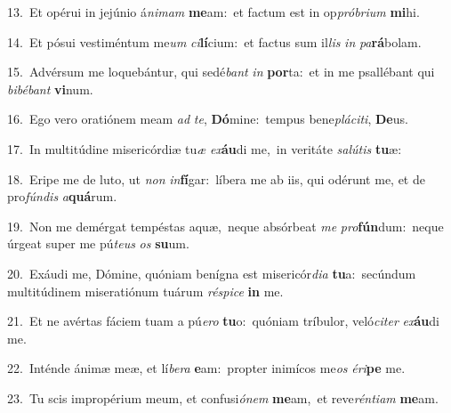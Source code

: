 {\numbfont\textcolor{\numbcolor}{13.}}~Et opérui in jejúnio á\-\textit{ni}\-\textit{mam} \textbf{me}\-am:~\star et factum est in op\-\textit{pró}\-\textit{bri}\textit{um} \textbf{mi}\-hi.\par
{\numbfont\textcolor{\numbcolor}{14.}}~Et pósui vestiméntum me\textit{um} \textit{ci}\-\textbf{lí}cium:~\star et factus sum il\textit{lis} \textit{in} \textit{pa}\-\textbf{rá}bolam.\par
{\numbfont\textcolor{\numbcolor}{15.}}~Advérsum me loquebántur, qui sedé\textit{bant} \textit{in} \textbf{por}\-ta:~\star et in me psallébant qui \textit{bi}\-\textit{bé}\textit{bant} \textbf{vi}\-num.\par
{\numbfont\textcolor{\numbcolor}{16.}}~Ego vero oratiónem meam \textit{ad} \textit{te}\-, \textbf{Dó}\-mine:~\star tempus bene\-\textit{plá}\-\textit{ci}\textit{ti}, \textbf{De}\-us.\par
{\numbfont\textcolor{\numbcolor}{17.}}~In multitúdine misericórdiæ tu\textit{æ} \textit{ex}\-\textbf{áu}di me,~\star in veritáte \textit{sa}\-\textit{lú}\textit{tis} \textbf{tu}\-æ:\par
{\numbfont\textcolor{\numbcolor}{18.}}~Eripe me de luto, ut \textit{non} \textit{in}\-\textbf{fí}gar:~\star líbera me ab iis, qui odérunt me, et de pro\-\textit{fún}\-\textit{dis} \textit{a}\-\textbf{quá}rum.\par
{\numbfont\textcolor{\numbcolor}{19.}}~Non me demérgat tempéstas aquæ,~\dagger neque absórbeat \textit{me} \textit{pro}\-\textbf{fún}dum:~\star neque úrgeat super me pú\-\textit{te}\-\textit{us} \textit{os} \textbf{su}\-um.\par
{\numbfont\textcolor{\numbcolor}{20.}}~Exáudi me, Dómine, quóniam benígna est misericór\-\textit{di}\-\textit{a} \textbf{tu}\-a:~\star secúndum multitúdinem miseratiónum tuárum \textit{ré}\-\textit{spi}\textit{ce} \textbf{in} me.\par
{\numbfont\textcolor{\numbcolor}{21.}}~Et ne avértas fáciem tuam a pú\-\textit{e}\-\textit{ro} \textbf{tu}\-o:~\star quóniam tríbulor, veló\-\textit{ci}\-\textit{ter} \textit{ex}\-\textbf{áu}di me.\par
{\numbfont\textcolor{\numbcolor}{22.}}~Inténde ánimæ meæ, et lí\-\textit{be}\-\textit{ra} \textbf{e}\-am:~\star propter inimícos me\textit{os} \textit{é}\-\textit{ri}\textbf{pe} me.\par
{\numbfont\textcolor{\numbcolor}{23.}}~Tu scis impropérium meum, et confusi\-\textit{ó}\-\textit{nem} \textbf{me}\-am,~\star et reve\-\textit{rén}\-\textit{ti}\textit{am} \textbf{me}\-am.\par
